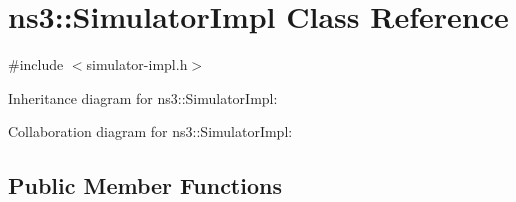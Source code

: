 \hypertarget{classns3_1_1SimulatorImpl}{}\section{ns3\+:\+:Simulator\+Impl Class Reference}
\label{classns3_1_1SimulatorImpl}


{\ttfamily \#include $<$simulator-\/impl.\+h$>$}



Inheritance diagram for ns3\+:\+:Simulator\+Impl\+:


Collaboration diagram for ns3\+:\+:Simulator\+Impl\+:
\subsection*{Public Member Functions}
